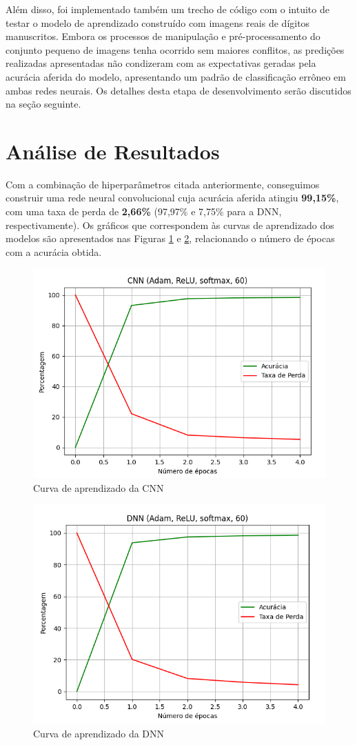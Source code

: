 \documentclass[a4paper, 12pt]{article}
\begin{document}
Além disso, foi implementado também um trecho de código com o intuito de testar o modelo de aprendizado construído com imagens reais de dígitos manuscritos. Embora os processos de manipulação e pré-processamento do conjunto pequeno de imagens tenha ocorrido sem maiores conflitos, as predições realizadas apresentadas não condizeram com as expectativas geradas pela acurácia aferida do modelo, apresentando um padrão de classificação errôneo em ambas redes neurais. Os detalhes desta etapa de desenvolvimento serão discutidos na seção seguinte.

\section{Análise de Resultados}

Com a combinação de hiperparâmetros citada anteriormente, conseguimos construir uma rede neural convolucional cuja acurácia aferida atingiu \textbf{99,15\%}, com uma taxa de perda de \textbf{2,66\%} (97,97\% e 7,75\% para a DNN, respectivamente). Os gráficos que correspondem às curvas de aprendizado dos modelos são apresentados nas Figuras \ref{fig:exanpleFig1} e \ref{fig:exanpleFig2}, relacionando o número de épocas com a acurácia obtida.

\vspace*{-0.5cm}
\begin{figure}[H]
    \centering
    \includegraphics[width=.72\textwidth]{Images/cnn.png}
    \caption{Curva de aprendizado da CNN}
    \label{fig:exanpleFig1}
\end{figure}
\vspace*{-0.5cm}
\begin{figure}[H]
    \centering
    \includegraphics[width=.72\textwidth]{Images/dnn.png}
    \caption{Curva de aprendizado da DNN}
    \label{fig:exanpleFig2}
\end{figure}
\end{document}
